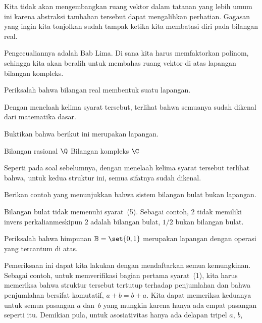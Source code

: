 Kita tidak akan mengembangkan ruang vektor dalam tatanan yang lebih umum ini
karena abstraksi tambahan tersebut dapat mengalihkan perhatian.
Gagasan yang ingin kita tonjolkan sudah tampak ketika kita membatasi diri
pada bilangan real.

Pengecualiannya adalah Bab Lima.
Di sana kita harus memfaktorkan polinom,
sehingga kita akan beralih untuk membahas ruang vektor di atas
lapangan bilangan kompleks.

\begin{exercises}
  \item 
    Periksalah bahwa bilangan real membentuk suatu lapangan.
    \begin{answer}
      Dengan menelaah kelima syarat tersebut, terlihat bahwa semuanya sudah
      dikenal dari matematika dasar.
    \end{answer}
  \item 
    Buktikan bahwa berikut ini merupakan lapangan.
    \begin{exparts*}
       \partsitem Bilangan rasional $\Q$
       \partsitem Bilangan kompleks  $\C$
    \end{exparts*}
    \begin{answer}
      Seperti pada soal sebelumnya, dengan menelaah kelima syarat tersebut
      terlihat bahwa, untuk kedua struktur ini,
      semua sifatnya sudah dikenal.
    \end{answer}
  \item 
     Berikan contoh yang menunjukkan bahwa sistem bilangan bulat
     bukan lapangan.
     \begin{answer}
       Bilangan bulat tidak memenuhi syarat~(5).
       Sebagai contoh, $2$ tidak memiliki invers perkalian\Dash meskipun
       $2$ adalah bilangan bulat, $1/2$ bukan bilangan bulat.
     \end{answer}
  \item \label{exer:BinField} 
     Periksalah bahwa himpunan $\mathbb{B}=\set{0,1}$ merupakan lapangan
     dengan operasi yang tercantum di atas.
     \begin{answer}
       Pemeriksaan ini dapat kita lakukan dengan mendaftarkan semua
       kemungkinan.
       Sebagai contoh, untuk memverifikasi bagian pertama syarat~(1), kita
       harus memeriksa bahwa struktur tersebut tertutup terhadap penjumlahan
       dan bahwa penjumlahan bersifat komutatif, $a+b=b+a$.
       Kita dapat memeriksa keduanya untuk semua pasangan $a$ dan~$b$ yang
       mungkin karena hanya ada empat pasangan seperti itu.
       Demikian pula, untuk asosiativitas hanya ada delapan tripel $a$, $b$,

\end{answer}
\end{exercises}
